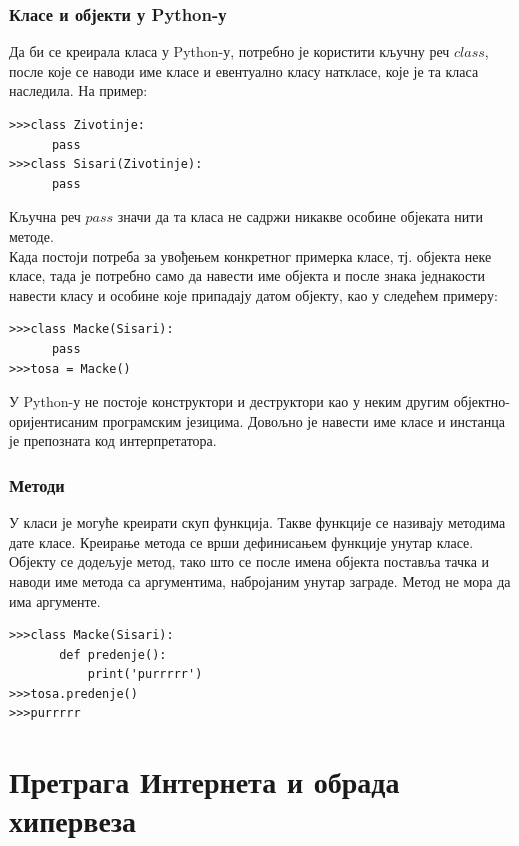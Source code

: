 \documentclass[11pt, serbianc, english, titlepage]{article}
\begin{document}
		\subsubsection{Класе и објекти у Python-у}
		Да би се креирала класа у Python-у, потребно је користити кључну реч $class$, после које се наводи име класе и евентуално класу наткласе, које је та класа наследила. На пример:
		\begin{lstlisting}[caption=Дефинисање класа, label=class]
>>>class Zivotinje:
      pass
>>>class Sisari(Zivotinje):
      pass
		\end{lstlisting}
	    Кључна реч $pass$ значи да та класа не садржи никакве особине објеката нити методе.\\
\pagebreak	    
	    Када постоји потреба за увођењем конкретног примерка класе, тј. објекта неке класе, тада је потребно само да навести име објекта и после знака једнакости навести класу и особине које припадају датом објекту, као у следећем примеру: 
	    \begin{lstlisting}[caption=Креирање објекта, label=objects]
>>>class Macke(Sisari):
      pass
>>>tosa = Macke()	    
	    \end{lstlisting}
	    У Python-у не постоје конструктори и деструктори као у неким другим објектно-оријентисаним програмским језицима. Довољно је навести име класе и инстанца је препозната код интерпретатора. 
		\subsubsection{Методи}
		У класи је могуће креирати скуп функција. Такве функције се називају методима дате класе. Креирање метода се врши дефинисањем функције унутар класе.\\
		Објекту се додељује метод, тако што се после имена објекта поставља тачка и наводи име метода са аргументима, набројаним унутар заграде. Метод не мора да има аргументе. 
		\begin{lstlisting}[caption= Методи класе, label=method]
>>>class Macke(Sisari):
       def predenje():
           print('purrrrr')
>>>tosa.predenje()
>>>purrrrr 
		\end{lstlisting} 
		
		 \pagebreak 
		 

		
\section{Претрага Интернета и обрада хипервеза}
\end{document}
